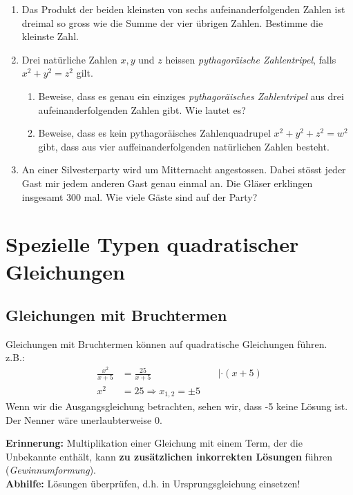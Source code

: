 \documentclass[11pt,oneside]{article}
\begin{document}
	\begin{aufgabe}
		\begin{enumerate}[label=\alph*)]
			\item Das Produkt der beiden kleinsten von sechs aufeinanderfolgenden Zahlen ist dreimal so gross wie die Summe der vier übrigen Zahlen. Bestimme die kleinste Zahl.
			\item Drei natürliche Zahlen $x,y$ und $z$ heissen \textit{pythagoräische Zahlentripel}, falls $x^2+y^2=z^2$ gilt.
			\begin{enumerate}
				\item Beweise, dass es genau ein einziges \textit{pythagoräisches Zahlentripel} aus drei aufeinanderfolgenden Zahlen gibt. Wie lautet es?
				\item Beweise, dass es kein pythagoräisches Zahlenquadrupel $x^2+y^2+z^2=w^2$ gibt, dass aus vier auffeinanderfolgenden natürlichen Zahlen besteht.
			\end{enumerate}
			\item An einer Silvesterparty wird um Mitternacht angestossen. Dabei stösst jeder Gast mir jedem anderen Gast genau einmal an. Die Gläser erklingen insgesamt $300$ mal. Wie viele Gäste sind auf der Party?
		\end{enumerate}
	\end{aufgabe}


\newpage
\section{Spezielle Typen quadratischer Gleichungen}
\subsection{Gleichungen mit Bruchtermen}
	Gleichungen mit Bruchtermen können auf quadratische Gleichungen führen.\\ z.B.:
	\begin{align*}
		\frac{x^2}{x+5}&=\frac{25}{x+5}&~&|\cdot (x+5)\\
		x^2&=25
		\Rightarrow x_{1,2}=\pm 5
	\end{align*}
	Wenn wir die Ausgangsgleichung betrachten, sehen wir, dass -5 keine Lösung ist. Der Nenner wäre unerlaubterweise 0.
	\begin{framed}\noindent
		\textbf{Erinnerung:}
		Multiplikation einer Gleichung mit einem Term, der die Unbekannte enthält, kann \textbf{zu zusätzlichen inkorrekten Lösungen} führen (\textit{Gewinnumformung}).\\
		\textbf{Abhilfe:}
		Lösungen überprüfen, d.h. in Ursprungsgleichung einsetzen!
	\end{framed}
\end{document}
